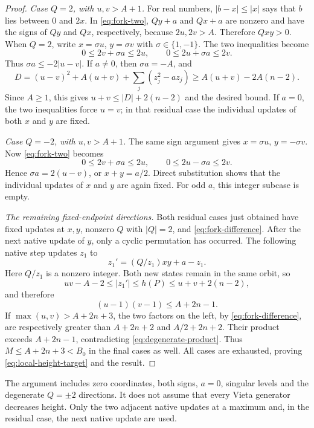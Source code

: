 \begin{proof}
\emph{Case $Q=2$, with $u,v>A+1$.}
For real numbers, $|b-x|\le|x|$ says that $b$ lies between
$0$ and $2x$. In \eqref{eq:fork-two}, $Qy+a$ and $Qx+a$
are nonzero and have the signs of $Qy$ and $Qx$, respectively,
because $2u,2v>A$. Therefore $Qxy>0$. When $Q=2$, write
$x=\sigma u$, $y=\sigma v$ with $\sigma\in\{1,-1\}$.
The two inequalities become
\[
 0\le2v+\sigma a\le2u,\qquad
 0\le2u+\sigma a\le2v.
\]
Thus $\sigma a\le-2|u-v|$. If $a\ne0$, then $\sigma a=-A$,
and
\[
 D=(u-v)^2+A(u+v)+\sum_j(z_j^2-a z_j)
   \ge A(u+v)-2A(n-2).
\]
Since $A\ge1$, this gives $u+v\le|D|+2(n-2)$ and the
desired bound. If $a=0$, the two inequalities force $u=v$;
in that residual case the individual updates of both $x$ and $y$
are fixed.

\emph{Case $Q=-2$, with $u,v>A+1$.}
The same sign argument gives $x=\sigma u$, $y=-\sigma v$.
Now \eqref{eq:fork-two} becomes
\[
 0\le2v+\sigma a\le2u,\qquad
 0\le2u-\sigma a\le2v.
\]
Hence $\sigma a=2(u-v)$, or $x+y=a/2$. Direct substitution
shows that the individual updates of $x$ and $y$ are again fixed.
For odd $a$, this integer subcase is empty.

\emph{The remaining fixed-endpoint directions.}
Both residual cases just obtained have fixed updates at $x,y$,
nonzero $Q$ with $|Q|=2$, and \eqref{eq:fork-difference}.
After the next native update of $y$, only a cyclic permutation
has occurred. The following native step updates $z_1$ to
\[
 z_1'=(Q/z_1)xy+a-z_1.
\]
Here $Q/z_1$ is a nonzero integer. Both new states remain in the
same orbit, so
\[
 uv-A-2\le|z_1'|\le h(P)\le u+v+2(n-2),
\]
and therefore
\begin{equation}
 (u-1)(v-1)\le A+2n-1.
 \label{eq:degenerate-product}
\end{equation}
If $\max(u,v)>A+2n+3$, the two factors on the left, by
\eqref{eq:fork-difference}, are respectively greater than
$A+2n+2$ and $A/2+2n+2$. Their product exceeds $A+2n-1$,
contradicting \eqref{eq:degenerate-product}. Thus
$M\le A+2n+3<B_0$ in the final cases as well. All cases
are exhausted, proving \eqref{eq:local-height-target} and the result.
\end{proof}

The argument includes zero coordinates, both signs, $a=0$, singular
levels and the degenerate $Q=\pm2$ directions. It does not assume
that every Vieta generator decreases height. Only the two adjacent
native updates at a maximum and, in the residual case, the next
native update are used.
